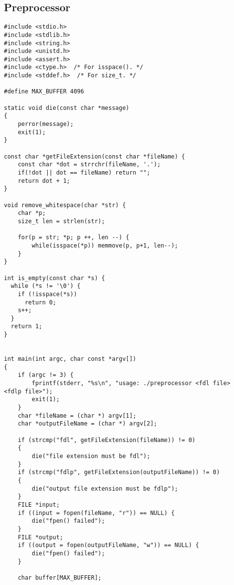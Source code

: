 \documentclass[11pt]{article}
\begin{document}
\subsection{Preprocessor}
\begin{listing}[H]
  \begin{verbatim}
#include <stdio.h>
#include <stdlib.h>
#include <string.h>
#include <unistd.h>
#include <assert.h>
#include <ctype.h>  /* For isspace(). */
#include <stddef.h>  /* For size_t. */

#define MAX_BUFFER 4096

static void die(const char *message)
{
    perror(message);
    exit(1);
}

const char *getFileExtension(const char *fileName) {
    const char *dot = strrchr(fileName, '.');
    if(!dot || dot == fileName) return "";
    return dot + 1;
}

void remove_whitespace(char *str) {
    char *p;
    size_t len = strlen(str);

    for(p = str; *p; p ++, len --) {
        while(isspace(*p)) memmove(p, p+1, len--);
    }
}

int is_empty(const char *s) {
  while (*s != '\0') {
    if (!isspace(*s))
      return 0;
    s++;
  }
  return 1;
}


int main(int argc, char const *argv[])
{
    if (argc != 3) {
        fprintf(stderr, "%s\n", "usage: ./preprocessor <fdl file> <fdlp file>");
        exit(1);
    }
    char *fileName = (char *) argv[1];
    char *outputFileName = (char *) argv[2];

    if (strcmp("fdl", getFileExtension(fileName)) != 0)
    {
        die("file extension must be fdl");
    }
    if (strcmp("fdlp", getFileExtension(outputFileName)) != 0)
    {
        die("output file extension must be fdlp");
    }
    FILE *input;
    if ((input = fopen(fileName, "r")) == NULL) {
        die("fpen() failed");
    }
    FILE *output;
    if ((output = fopen(outputFileName, "w")) == NULL) {
        die("fpen() failed");
    }

    char buffer[MAX_BUFFER];
  \end{verbatim}
\end{listing}
\end{document}
